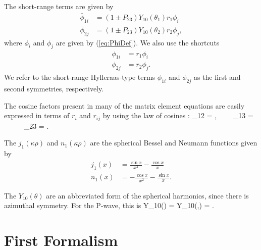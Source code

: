 \documentclass[Dissertation.tex]{subfiles}
\begin{document}
\noindent The short-range terms are given by
\begin{subequations}
\label{eq:PWavePhiBar}
\begin{align}
\bar{\phi}_{1i} &= \left(1 \pm P_{23}\right) Y_{10}(\theta_1) r_1 \phi_i \label{eq:PWavePhi1i}\\
\bar{\phi}_{2j} &= \left(1 \pm P_{23}\right) Y_{10}(\theta_2) r_2 \phi_j \label{eq:PWavePhi2j},
\end{align}
\end{subequations}
where $\phi_i$ and $\phi_j$ are given by (\ref{eq:PhiDef}).  We also use the shortcuts
\begin{subequations}
\label{eq:PWavePhi}
\begin{align}
\phi_{1i} &= r_1 \phi_i \\
\phi_{2j} &= r_2 \phi_j.
\end{align}
\end{subequations}
We refer to the short-range Hylleraas-type terms $\phi_{1i}$ and $\phi_{2j}$ as
the first and second symmetries, respectively.

The cosine factors present in many of the matrix element equations are easily expressed in terms of $r_i$ and $r_{ij}$ by using the law of cosines \cite[p.174]{CRC1978}:
\beq
\label{eq:Cosines}
\cos\theta_{12} = , \ \ \ \ \cos\theta_{13} =  \ \ \   \ \ \cos\theta_{23} = .
\eeq

\noindent The $j_1(\kappa\rho)$ and $n_1(\kappa\rho)$ are the spherical Bessel and Neumann functions given by \cite[p.729]{Arfken2005}
\begin{subequations}
\label{eq:PWaveBessel}
\begin{align}
j_1(x) & = \frac{\sin x}{x^2} - \frac{\cos x}{x} \label{eq:Bessel1} \\
n_1(x) & = -\frac{\cos x}{x^2} - \frac{\sin x}{x}. \label{eq:Neumann1}
\end{align}
\end{subequations}

\noindent The $Y_{10}(\theta)$ are an abbreviated form of the spherical harmonics, since there is azimuthal symmetry. For the P-wave, this is
\beq
\label{eq:PWaveSpherHarm}
Y_{10}(\theta) = Y_{10}(\theta,\varphi) =  \cos\theta.
\eeq


\section{First Formalism}
\end{document}
